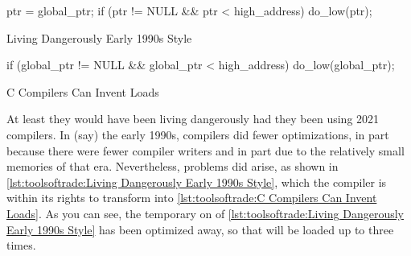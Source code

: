 \begin{listing}
\begin{fcvlabel}
\begin{VerbatimL}[commandchars=\\\{\}]
ptr = global_ptr;
if (ptr != NULL && ptr < high_address)
	do_low(ptr);
\end{VerbatimL}
\end{fcvlabel}
\caption{Living Dangerously Early 1990s Style}
\label{lst:toolsoftrade:Living Dangerously Early 1990s Style}
\end{listing}

\begin{listing}
\begin{fcvlabel}
\begin{VerbatimL}[commandchars=\\\{\}]
if (global_ptr != NULL &&
    global_ptr < high_address)
	do_low(global_ptr);
\end{VerbatimL}
\end{fcvlabel}
\caption{C Compilers Can Invent Loads}
\label{lst:toolsoftrade:C Compilers Can Invent Loads}
\end{listing}

At least they would have been living dangerously had they been using
2021 compilers.
In (say) the early 1990s, compilers did fewer optimizations, in part
because there were fewer compiler writers and in part due to the
relatively small memories of that era.
Nevertheless, problems did arise, as shown in
\cref{lst:toolsoftrade:Living Dangerously Early 1990s Style},
which the compiler is within its rights to transform into
\cref{lst:toolsoftrade:C Compilers Can Invent Loads}.
As you can see, the temporary on
 of
\cref{lst:toolsoftrade:Living Dangerously Early 1990s Style}
has been optimized away, so that  will be loaded
up to three times.

